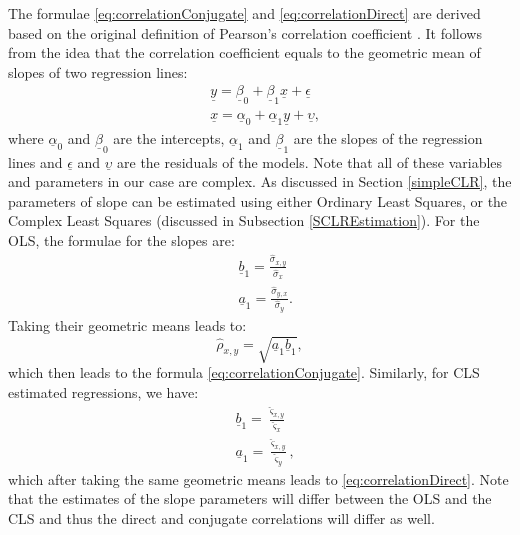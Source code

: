 \documentclass[
]{book}
\begin{document}
The formulae \eqref{eq:correlationConjugate} and \eqref{eq:correlationDirect} are derived based on the original definition of Pearson's correlation coefficient \citep{refPearson}. It follows from the idea that the correlation coefficient equals to the geometric mean of slopes of two regression lines:
\begin{equation}
    \begin{aligned}
        &\underline{y} = \underline{\beta}_0 + \underline{\beta}_1 \underline{x} + \underline{\epsilon} \\
        &\underline{x} = \underline{\alpha}_0 + \underline{\alpha}_1 \underline{y} + \underline{\upsilon} ,
    \end{aligned}
    \label{eq:twoRegressions}
\end{equation}
where \(\underline{\alpha}_0\) and \(\underline{\beta}_0\) are the intercepts, \(\underline{\alpha}_1\) and \(\underline{\beta}_1\) are the slopes of the regression lines and \(\underline{\epsilon}\) and \(\underline{\upsilon}\) are the residuals of the models. Note that all of these variables and parameters in our case are complex. As discussed in Section \ref{simpleCLR}, the parameters of slope can be estimated using either Ordinary Least Squares, or the Complex Least Squares (discussed in Subsection \ref{SCLREstimation}). For the OLS, the formulae for the slopes are:
\begin{equation}
    \begin{aligned}
        &\underline{b}_1 = \frac{\hat{\sigma}_{x,y}}{\hat{\sigma}_x} \\
        &\underline{a}_1 = \frac{\hat{\sigma}_{y,x}}{\hat{\sigma}_y} .
    \end{aligned}
    \label{eq:twoRegressionsOLS}
\end{equation}
Taking their geometric means leads to:
\begin{equation}
    \hat{\rho}_{x,y} = \sqrt{\underline{a}_1 \underline{b}_1},
    \label{eq:correlationConventionalEstimate}
\end{equation}
which then leads to the formula \eqref{eq:correlationConjugate}. Similarly, for CLS estimated regressions, we have:
\begin{equation}
    \begin{aligned}
        &\underline{b}_1 = \frac{\hat{\varsigma}_{x,y}}{\hat{\varsigma}_x} \\
        &\underline{a}_1 = \frac{\hat{\varsigma}_{x,y}}{\hat{\varsigma}_y} ,
    \end{aligned}
    \label{eq:twoRegressionsCLS}
\end{equation}
which after taking the same geometric means leads to \eqref{eq:correlationDirect}. Note that the estimates of the slope parameters will differ between the OLS and the CLS and thus the direct and conjugate correlations will differ as well.
\end{document}
